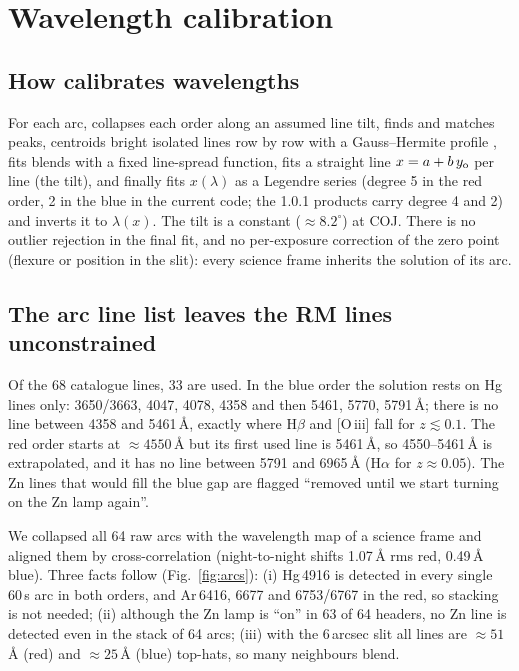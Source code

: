 \section{Wavelength calibration}
\label{sec:wavelength}

\subsection{How \banzai{} calibrates wavelengths}
\label{sec:wl_banzai}
For each arc, \banzai{} collapses each order along an assumed line tilt, finds and matches peaks, centroids bright
isolated lines row by row with a Gauss--Hermite profile \citep{Cappellari2017}, fits blends with a fixed line-spread
function, fits a straight line $x=a+b\,y_{\rm o}$ per line (the tilt), and finally fits
$x(\lambda)$ as a Legendre series (degree 5 in the red order, 2 in the blue in the current code; the 1.0.1 products
carry degree 4 and 2) and inverts it to $\lambda(x)$. The tilt is a constant ($\approx8.2^\circ$) at COJ. There is no
outlier rejection in the final fit, and no per-exposure correction of the zero point (flexure or position in the
slit): every science frame inherits the solution of its arc.

\subsection{The arc line list leaves the RM lines unconstrained}
\label{sec:wl_lines}
Of the 68 catalogue lines, 33 are used. In the blue order the solution rests on Hg lines only: 3650/3663, 4047,
4078, 4358 and then 5461, 5770, 5791\,\AA{}; there is no line between 4358 and 5461\,\AA{}, exactly where H$\beta$ and
[O\,{\sc iii}] fall for $z\lesssim0.1$. The red order starts at $\approx4550$\,\AA{} but its first used line is
5461\,\AA{}, so 4550--5461\,\AA{} is extrapolated, and it has no line between 5791 and 6965\,\AA{} (H$\alpha$ for
$z\approx0.05$). The Zn lines that would fill the blue gap are flagged ``removed until we start turning on the Zn
lamp again''.

We collapsed all 64 raw arcs with the wavelength map of a science frame and aligned them by cross-correlation
(night-to-night shifts 1.07\,\AA{} rms red, 0.49\,\AA{} blue). Three facts follow (Fig.~\ref{fig:arcs}):
(i) Hg\,4916 is detected in every single 60\,s arc in both orders, and Ar\,6416, 6677 and 6753/6767 in the red, so
stacking is not needed; (ii) although the Zn lamp is ``on'' in 63 of 64 headers, no Zn line is detected even in the
stack of 64 arcs; (iii) with the 6\,arcsec slit all lines are $\approx51$\,\AA{} (red) and $\approx25$\,\AA{}
(blue) top-hats, so many neighbours blend.

